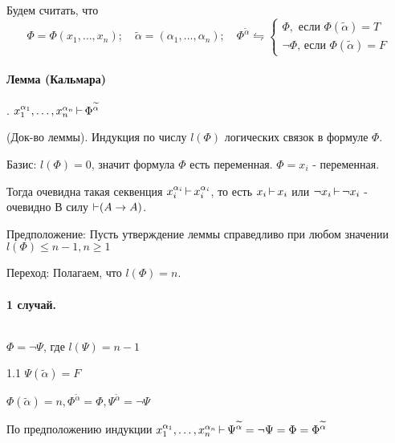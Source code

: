 \begin{myproof}
Будем считать, что
\[
    \Phi = \Phi(x_1,\ldots,x_{n});\quad \widetilde{\alpha} = (\alpha_1,\ldots,\alpha_n);
    \quad \Phi^{\widetilde{\alpha}} \leftrightharpoons
    \begin{cases}
        \Phi,\text{ если } \Phi(\widetilde{\alpha}) = T\\
        \lnot\Phi\text{, если } \Phi(\widetilde{\alpha}) = F
    \end{cases}
\]

\paragraph*{Лемма (Кальмара)}.
$x^{\alpha_1}_1, \ldots,x_{n}^{\alpha_n} \operatorname{\vdash} \Phi^{\widetilde{\alpha}}$ 
\begin{myproof}
    (Док-во леммы).
    Индукция по числу $l(\Phi)$ логических связок в формуле  $\Phi$.

    \medskip

    Базис: $l(\Phi) = 0$, значит формула  $\Phi$ есть переменная.
     $\Phi = x_{i}$ - переменная.

     Тогда очевидна такая секвенция
     $x_{i}^{\alpha_i} \operatorname{\vdash} x_{i}^{\alpha_i}$, то есть
     $x_{i}\operatorname{\vdash} x_{i}$ или $\lnot x_{i} \operatorname{\vdash} \lnot x_{i}$ - очевидно
     В силу $\operatorname{\vdash}(A \to A)$.
    
     \medskip

     Предположение: Пусть утверждение леммы справедливо при любом значении $l(\Phi) \le n-1,
     n \ge 1$

     \medskip

     Переход: Полагаем, что $l(\Phi) = n$.

     \paragraph*{1 случай.} ${}$ \newline

      $\Phi = \lnot \Psi$, где  $l(\Psi) = n - 1$

      1.1  $\Psi(\widetilde{\alpha}) = F$

      $\Phi(\widetilde{\alpha}) = n, \Phi^{\widetilde{\alpha}} = \Phi, \Psi^{\widetilde{\alpha}} =
      \lnot \Psi$ 

      По предположению индукции $x_1^{\alpha_1}, \ldots, x_{n}^{\alpha_n} \operatorname{\vdash}
      \Psi^{\widetilde{\alpha}} = \lnot\Psi = \Phi = \Phi^{\widetilde{\alpha}}$ 

      \medskip


\end{myproof}
\end{myproof}
